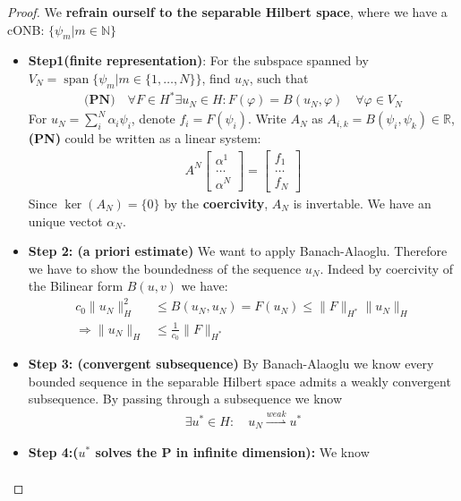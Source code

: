 \documentclass[a4paper,11pt,oneside,fleqn]{book}
\theoremstyle{definition}
\theoremstyle{remark}
\DeclareMathOperator*{\spa}{span}
\begin{document}
\begin{proof} We \textbf{refrain ourself to the separable Hilbert space}, where we have a cONB: $\{ \psi
_m | m \in \mathbb{N} \}$
\begin{itemize}
\item \textbf{Step1(finite representation)}: 
For the subspace spanned by $V_N = \spa \{ \psi_m | m \in \{1, \dots, N\} \}$, find $u_N$, such that 
\begin{align*}
	\textbf{(PN)} \quad \forall F \in H^* \exists u_N \in H: F(\varphi) = B(u_N, \varphi) \quad \forall \varphi \in V_N
\end{align*}
For $u_N = \sum^N_i \alpha_i \psi_i$, denote $f_i = F(\psi_i) $. Write $A_N$ as $A_{i, k} = B(\psi_i, \psi_k ) \in \mathbb{R} $, \textbf{(PN)} could be written as a linear system:
\begin{align*}
	A^N 
	\begin{bmatrix}
		\alpha^1 \\
		\dots\\
		\alpha^N
	\end{bmatrix}
	= 
	\begin{bmatrix}
		f_1 \\
		\dots\\
		f_N
	\end{bmatrix}
\end{align*}
Since $\ker(A_N) = \{0\}$ by the \textbf{coercivity}, $A_N$ is invertable. We have an unique vectot $\alpha_N$.
\item \textbf{Step 2: (a priori estimate)}
We want to apply Banach-Alaoglu. Therefore we have to show the boundedness of the sequence $u_N$. Indeed by coercivity of the Bilinear form $B(u, v)$ we have:
\begin{align*}
	c_0 \|u_N\|_H^2 &\leq B(u_N, u_N) = F(u_N) \leq \|F\|_{H^*}\|u_N\|_H\\
	\Rightarrow 
	 \|u_N\|_H &\leq \frac{1}{c_0}  \|F\|_{H^*}
\end{align*}
\item \textbf{Step 3: (convergent subsequence)}
By Banach-Alaoglu we know every bounded sequence in the separable Hilbert space admits a weakly convergent subsequence. By passing through a subsequence we know
\begin{align*}
	\exists u^* \in H: \quad u_N \overset{weak}{\rightharpoonup} u^*
\end{align*}
\item \textbf{Step 4:($u^*$ solves the P in infinite dimension):} We know
\begin{align*}

\end{align*}
\end{itemize}
\end{proof}
\end{document}
